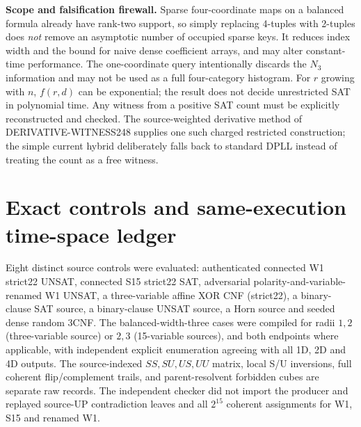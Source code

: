 \documentclass[11pt]{article}
\begin{document}
\noindent\textbf{Scope and falsification firewall.} Sparse four-coordinate maps on a balanced formula already have rank-two support, so simply replacing 4-tuples with 2-tuples does \emph{not} remove an asymptotic number of occupied sparse keys. It reduces index width and the bound for naive dense coefficient arrays, and may alter constant-time performance. The one-coordinate query intentionally discards the $N_3$ information and may not be used as a full four-category histogram. For $r$ growing with $n$, $f(r,d)$ can be exponential; the result does not decide unrestricted SAT in polynomial time. Any witness from a positive SAT count must be explicitly reconstructed and checked. The source-weighted derivative method of DERIVATIVE-WITNESS248 supplies one such charged restricted construction; the simple current hybrid deliberately falls back to standard DPLL instead of treating the count as a free witness.

\section{Exact controls and same-execution time-space ledger}
Eight distinct source controls were evaluated: authenticated connected W1 strict22 UNSAT, connected S15 strict22 SAT, adversarial polarity-and-variable-renamed W1 UNSAT, a three-variable affine XOR CNF (strict22), a binary-clause SAT source, a binary-clause UNSAT source, a Horn source and seeded dense random 3CNF. The balanced-width-three cases were compiled for radii $1,2$ (three-variable source) or $2,3$ (15-variable sources), and both endpoints where applicable, with independent explicit enumeration agreeing with all 1D, 2D and 4D outputs. The source-indexed $SS,SU,US,UU$ matrix, local S/U inversions, full coherent flip/complement trails, and parent-resolvent forbidden cubes are separate raw records. The independent checker did not import the producer and replayed source-UP contradiction leaves and all $2^{15}$ coherent assignments for W1, S15 and renamed W1.
\end{document}
